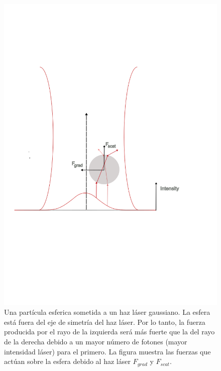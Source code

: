 \documentclass[10pt,aspectratio=1610,compress,dvipsnames]{beamer}
\begin{document}
\begin{frame}
{\begin{figure}
    \centering
    \includegraphics[trim={0cm 7.5cm 2cm 6cm },scale=0.37]{Imagenes teoria/Optical tweezer diagrams/finallyopticaltweezer.png}
    \caption{Una part\'icula esferica sometida a un haz láser gaussiano. La esfera está fuera del eje de simetría del haz láser. Por lo tanto, la fuerza producida por el rayo de la izquierda será más fuerte que la del rayo de la derecha debido a un mayor número de fotones (mayor intensidad láser) para el primero. La figura muestra las fuerzas que actúan sobre la esfera debido al haz láser $F_{grad}$ y $F_{scat}$. }
    \label{Microscope inverted}
\end{figure}




}
\end{frame}
\end{document}
